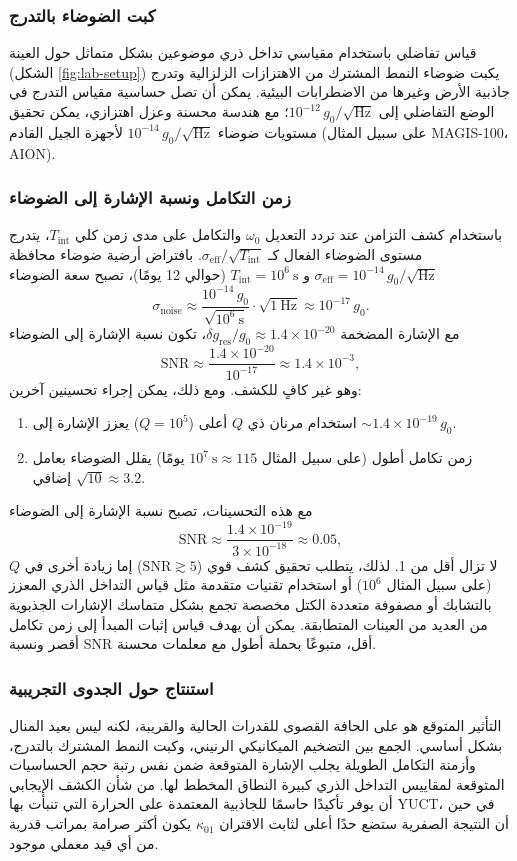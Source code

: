 \documentclass[11pt,a4paper]{article}
\begin{document}
	\subsubsection{كبت الضوضاء بالتدرج}
	قياس تفاضلي باستخدام مقياسي تداخل ذري موضوعين بشكل متماثل حول العينة (الشكل \ref{fig:lab-setup}) يكبت ضوضاء النمط المشترك من الاهتزازات الزلزالية وتدرج جاذبية الأرض وغيرها من الاضطرابات البيئية. يمكن أن تصل حساسية مقياس التدرج في الوضع التفاضلي إلى $10^{-12}\,g_0/\sqrt{\mathrm{Hz}}$؛ مع هندسة محسنة وعزل اهتزازي، يمكن تحقيق مستويات ضوضاء $10^{-14}\,g_0/\sqrt{\mathrm{Hz}}$ لأجهزة الجيل القادم (على سبيل المثال MAGIS-100، AION).
	
	\subsubsection{زمن التكامل ونسبة الإشارة إلى الضوضاء}
	باستخدام كشف التزامن عند تردد التعديل $\omega_0$ والتكامل على مدى زمن كلي $T_{\mathrm{int}}$، يتدرج مستوى الضوضاء الفعال كـ $\sigma_{\mathrm{eff}} / \sqrt{T_{\mathrm{int}}}$. بافتراض أرضية ضوضاء محافظة $\sigma_{\mathrm{eff}} = 10^{-14}\,g_0/\sqrt{\mathrm{Hz}}$ و $T_{\mathrm{int}} = 10^6\ \mathrm{s}$ (حوالي 12 يومًا)، تصبح سعة الضوضاء
	\[
	\sigma_{\mathrm{noise}} \approx \frac{10^{-14}\,g_0}{\sqrt{10^6\ \mathrm{s}}} \cdot \sqrt{1\ \mathrm{Hz}} \approx 10^{-17}\,g_0.
	\]
	مع الإشارة المضخمة $\delta g_{\mathrm{res}}/g_0 \approx 1.4\times10^{-20}$، تكون نسبة الإشارة إلى الضوضاء
	\[
	\mathrm{SNR} \approx \frac{1.4\times10^{-20}}{10^{-17}} \approx 1.4\times10^{-3},
	\]
	وهو غير كافٍ للكشف. ومع ذلك، يمكن إجراء تحسينين آخرين:
	\begin{enumerate}
		\item استخدام مرنان ذي $Q$ أعلى ($Q = 10^5$) يعزز الإشارة إلى $\sim 1.4\times10^{-19}\,g_0$.
		\item زمن تكامل أطول (على سبيل المثال $10^7\ \mathrm{s} \approx 115$ يومًا) يقلل الضوضاء بعامل إضافي $\sqrt{10} \approx 3.2$.
	\end{enumerate}
	مع هذه التحسينات، تصبح نسبة الإشارة إلى الضوضاء
	\[
	\mathrm{SNR} \approx \frac{1.4\times10^{-19}}{3\times10^{-18}} \approx 0.05,
	\]
	لا تزال أقل من 1. لذلك، يتطلب تحقيق كشف قوي ($\mathrm{SNR} \gtrsim 5$) إما زيادة أخرى في $Q$ (على سبيل المثال $10^6$) أو استخدام تقنيات متقدمة مثل قياس التداخل الذري المعزز بالتشابك أو مصفوفة متعددة الكتل مخصصة تجمع بشكل متماسك الإشارات الجذبوية من العديد من العينات المتطابقة. يمكن أن يهدف قياس إثبات المبدأ إلى زمن تكامل أقصر ونسبة SNR أقل، متبوعًا بحملة أطول مع معلمات محسنة.
	
	\subsubsection{استنتاج حول الجدوى التجريبية}
	التأثير المتوقع هو على الحافة القصوى للقدرات الحالية والقريبة، لكنه ليس بعيد المنال بشكل أساسي. الجمع بين التضخيم الميكانيكي الرنيني، وكبت النمط المشترك بالتدرج، وأزمنة التكامل الطويلة يجلب الإشارة المتوقعة ضمن نفس رتبة حجم الحساسيات المتوقعة لمقاييس التداخل الذري كبيرة النطاق المخطط لها. من شأن الكشف الإيجابي أن يوفر تأكيدًا حاسمًا للجاذبية المعتمدة على الحرارة التي تنبأت بها YUCT، في حين أن النتيجة الصفرية ستضع حدًا أعلى لثابت الاقتران $\kappa_{01}$ يكون أكثر صرامة بمراتب قدرية من أي قيد معملي موجود.
	
\end{document}
